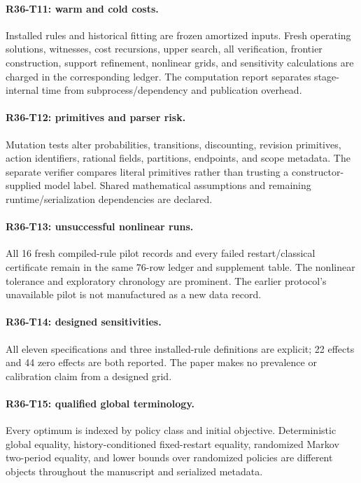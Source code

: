 \paragraph{R36-T11: warm and cold costs.} Installed rules and historical fitting are frozen amortized inputs. Fresh operating solutions, witnesses, cost recursions, upper search, all verification, frontier construction, support refinement, nonlinear grids, and sensitivity calculations are charged in the corresponding ledger. The computation report separates stage-internal time from subprocess/dependency and publication overhead.

\paragraph{R36-T12: primitives and parser risk.} Mutation tests alter probabilities, transitions, discounting, revision primitives, action identifiers, rational fields, partitions, endpoints, and scope metadata. The separate verifier compares literal primitives rather than trusting a constructor-supplied model label. Shared mathematical assumptions and remaining runtime/serialization dependencies are declared.

\paragraph{R36-T13: unsuccessful nonlinear runs.} All 16 fresh compiled-rule pilot records and every failed restart/classical certificate remain in the same 76-row ledger and supplement table. The nonlinear tolerance and exploratory chronology are prominent. The earlier protocol's unavailable pilot is not manufactured as a new data record.

\paragraph{R36-T14: designed sensitivities.} All eleven specifications and three installed-rule definitions are explicit; 22 effects and 44 zero effects are both reported. The paper makes no prevalence or calibration claim from a designed grid.

\paragraph{R36-T15: qualified global terminology.} Every optimum is indexed by policy class and initial objective. Deterministic global equality, history-conditioned fixed-restart equality, randomized Markov two-period equality, and lower bounds over randomized policies are different objects throughout the manuscript and serialized metadata.

